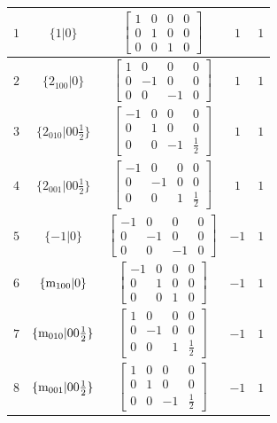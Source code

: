 \documentclass[fleqn,8pt]{jsarticle}
\begin{document}
\begin{longtable}{ccccc}
$ 1 $ & $ \{1|0\} $ & $ \begin{bmatrix} 1 & 0 & 0 & 0 \\ 0 & 1 & 0 & 0 \\ 0 & 0 & 1 & 0 \end{bmatrix} $ & $ 1 $ & $ 1 $ \\ \hline
$ 2 $ & $ \{2{}_{100}|0\} $ & $ \begin{bmatrix} 1 & 0 & 0 & 0 \\ 0 & -1 & 0 & 0 \\ 0 & 0 & -1 & 0 \end{bmatrix} $ & $ 1 $ & $ 1 $ \\ \hline
$ 3 $ & $ \{2{}_{010}|0 0 \frac{1}{2}\} $ & $ \begin{bmatrix} -1 & 0 & 0 & 0 \\ 0 & 1 & 0 & 0 \\ 0 & 0 & -1 & \frac{1}{2} \end{bmatrix} $ & $ 1 $ & $ 1 $ \\ \hline
$ 4 $ & $ \{2{}_{001}|0 0 \frac{1}{2}\} $ & $ \begin{bmatrix} -1 & 0 & 0 & 0 \\ 0 & -1 & 0 & 0 \\ 0 & 0 & 1 & \frac{1}{2} \end{bmatrix} $ & $ 1 $ & $ 1 $ \\ \hline
$ 5 $ & $ \{-1|0\} $ & $ \begin{bmatrix} -1 & 0 & 0 & 0 \\ 0 & -1 & 0 & 0 \\ 0 & 0 & -1 & 0 \end{bmatrix} $ & $ -1 $ & $ 1 $ \\ \hline
$ 6 $ & $ \{{\rm m}_{100}|0\} $ & $ \begin{bmatrix} -1 & 0 & 0 & 0 \\ 0 & 1 & 0 & 0 \\ 0 & 0 & 1 & 0 \end{bmatrix} $ & $ -1 $ & $ 1 $ \\ \hline
$ 7 $ & $ \{{\rm m}_{010}|0 0 \frac{1}{2}\} $ & $ \begin{bmatrix} 1 & 0 & 0 & 0 \\ 0 & -1 & 0 & 0 \\ 0 & 0 & 1 & \frac{1}{2} \end{bmatrix} $ & $ -1 $ & $ 1 $ \\ \hline
$ 8 $ & $ \{{\rm m}_{001}|0 0 \frac{1}{2}\} $ & $ \begin{bmatrix} 1 & 0 & 0 & 0 \\ 0 & 1 & 0 & 0 \\ 0 & 0 & -1 & \frac{1}{2} \end{bmatrix} $ & $ -1 $ & $ 1 $ \\ \hline

\end{longtable}
\end{document}
